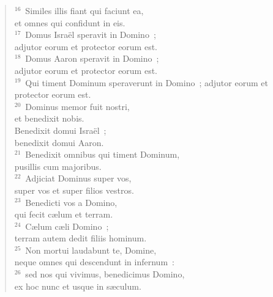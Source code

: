 \begin{flushleft}
\begin{verse}
${}^{16}$~Similes illis fiant qui faciunt ea,\\ et omnes qui confidunt in eis.\\
${}^{17}$~Domus Isra\"el speravit in Domino~;\\ adjutor eorum et protector eorum est.\\
${}^{18}$~Domus Aaron speravit in Domino~;\\ adjutor eorum et protector eorum est.\\
${}^{19}$~Qui timent Dominum speraverunt in Domino~; adjutor eorum et protector eorum est.\\
${}^{20}$~Dominus memor fuit nostri,\\ et benedixit nobis.\\ Benedixit domui Isra\"el~;\\ benedixit domui Aaron.\\
${}^{21}$~Benedixit omnibus qui timent Dominum,\\ pusillis cum majoribus.\\
${}^{22}$~Adjiciat Dominus super vos,\\ super vos et super filios vestros.\\
${}^{23}$~Benedicti vos a Domino,\\ qui fecit c\ae lum et terram.\\
${}^{24}$~C\ae lum c\ae li Domino~;\\ terram autem dedit filiis hominum.\\
${}^{25}$~Non mortui laudabunt te, Domine,\\ neque omnes qui descendunt in infernum~:\\
${}^{26}$~sed nos qui vivimus, benedicimus Domino,\\ ex hoc nunc et usque in s\ae culum.\end{verse}\end{flushleft}



